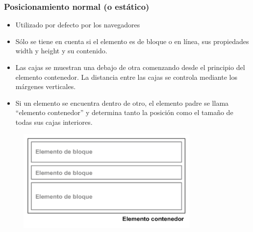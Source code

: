 
\begin{frame}
\frametitle{Posicionamiento normal (o estático)}

\begin{itemize}
  \item Utilizado por defecto por los navegadores
  \item Sólo se tiene en cuenta si el elemento es de bloque o en línea, sus propiedades width y height y su contenido.
  \item Las cajas se muestran una debajo de otra comenzando desde el principio del elemento contenedor. La distancia entre las cajas se controla mediante los márgenes verticales.
  \item Si un elemento se encuentra dentro de otro, el elemento padre se llama ``elemento contenedor'' y determina tanto la posición como el tamaño de todas sus cajas interiores.
\end{itemize}


\begin{center}
\begin{figure}[p]
\includegraphics[width=0.8\textwidth]{figs/f0502.png}
\end{figure}
\end{center}

\end{frame}



